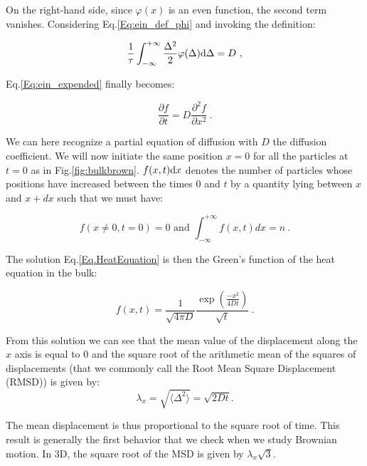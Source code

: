 On the right-hand side, since $\varphi(x)$ is an even function, the second term vanishes. Considering Eq.\ref{Eq:ein_def_phi} and invoking the definition:



\begin{equation}
	\frac{1}{\tau} \int_{-\infty}^{+\infty} \frac{\Delta^2}{2}\varphi(\Delta)\textnormal{d}\Delta = D ~,
\end{equation}

Eq.\ref{Eq:ein_expended} finally becomes:

\begin{equation}
	\frac{\partial f}{\partial t} = D \frac{\partial ^2 f}{\partial x ^2} ~.
	\label{Eq.HeatEquation}
\end{equation}


We can here recognize a partial equation of diffusion with $D$ the diffusion coefficient. We will now initiate the same position $x=0$ for all the particles at $t=0$ as in Fig.\ref{fig:bulkbrown}. $f(x,t)\textnormal{d}x$ denotes the number of particles whose positions have increased between the times  $0$ and $t$  by a quantity lying between $x$ and $x + dx$ such that we must have:

\begin{equation}
	f(x \ne 0, t=0) = 0 \text{ and } \int_{-\infty}^{+\infty}f(x,t)dx = n ~.
\end{equation}

The solution Eq.\ref{Eq.HeatEquation} is then the Green's function of the heat equation in the bulk:


\begin{equation}
	f(x,t) = \frac{1}{\sqrt{4\pi D}} \frac{\exp \left(\frac{-x^2}{4Dt} \right)}{\sqrt{t}} ~.
\end{equation}

From this solution we can see that the mean value of the displacement along the $x$ axis is equal to $0$ and the square root of the arithmetic mean of the squares of displacements (that we commonly call the Root Mean Square Displacement (R\gls{MSD}))  is given by:
\begin{equation}
	\lambda _x = \sqrt{\langle \Delta ^2 \rangle} =  \sqrt{2Dt}.
	\label{Eq:MSD_ein}
\end{equation}

The mean displacement is thus proportional to the square root of time. This result is generally the first behavior that we check when we study Brownian motion. In 3D, the square root of the \gls{MSD} is given by $\lambda_x \sqrt{3}$.

